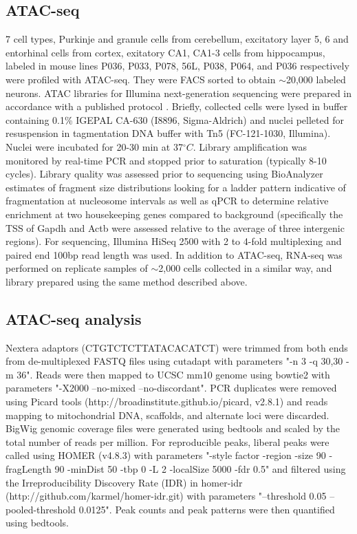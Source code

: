 \subsection{ATAC-seq}
7 cell types, Purkinje and granule cells from cerebellum, excitatory layer 5, 6 and entorhinal cells from cortex, exitatory CA1, CA1-3 cells from hippocampus, labeled in mouse lines P036, P033, P078, 56L, P038, P064, and P036 respectively \citep[all from][]{Shima_2016} were profiled with ATAC-seq. They were FACS sorted to obtain $\sim$20,000 labeled neurons. ATAC libraries for Illumina next-generation sequencing were prepared in accordance with a published protocol \citep{Buenrostro_2013}. Briefly, collected cells were lysed in buffer containing 0.1\% IGEPAL CA-630 (I8896, Sigma-Aldrich) and nuclei pelleted for resuspension in tagmentation DNA buffer with Tn5 (FC-121-1030, Illumina). Nuclei were incubated for 20-30 min at 37$^{\circ}C$. Library amplification was monitored by real-time PCR and stopped prior to saturation (typically 8-10 cycles). Library quality was assessed prior to sequencing using BioAnalyzer estimates of fragment size distributions looking for a ladder pattern indicative of fragmentation at nucleosome intervals as well as qPCR to determine relative enrichment at two housekeeping genes compared to background (specifically the TSS of Gapdh and Actb were assessed relative to the average of three intergenic regions). For sequencing, Illumina HiSeq 2500 with 2 to 4-fold multiplexing and paired end 100bp read length was used. In addition to ATAC-seq, RNA-seq was performed on replicate samples of $\sim$2,000 cells collected in a similar way, and library prepared using the same method described above.


\subsection{ATAC-seq analysis}
Nextera adaptors (CTGTCTCTTATACACATCT) were trimmed from both ends from de-multiplexed FASTQ files using cutadapt with parameters "-n 3 -q 30,30 -m 36". Reads were then mapped to UCSC mm10 genome using bowtie2 \citep{Langmead_2012} with parameters "-X2000 --no-mixed --no-discordant". PCR duplicates were removed using Picard tools (http://broadinstitute.github.io/picard, v2.8.1) and reads mapping to mitochondrial DNA, scaffolds, and alternate loci were discarded. BigWig genomic coverage files were generated using bedtools \citep{Quinlan_2010} and scaled by the total number of reads per million. For reproducible peaks, liberal peaks were called using HOMER (v4.8.3) \citep{Heinz_2010} with parameters "-style factor -region -size 90 -fragLength 90 -minDist 50 -tbp 0 -L 2 -localSize 5000 -fdr 0.5" and filtered using the Irreproducibility Discovery Rate (IDR) in homer-idr (http://github.com/karmel/homer-idr.git) with parameters "--threshold 0.05 --pooled-threshold 0.0125". Peak counts and peak patterns were then quantified using bedtools.


